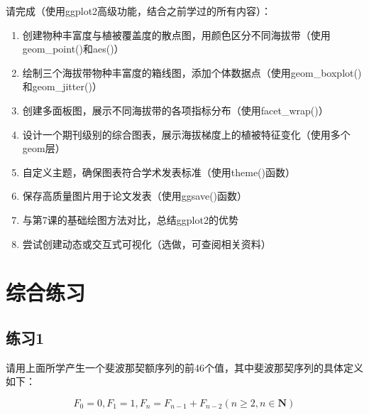 \documentclass[
]{book}
\begin{document}
请完成（使用ggplot2高级功能，结合之前学过的所有内容）：

\begin{enumerate}
\def\labelenumi{\arabic{enumi}.}
\item
  创建物种丰富度与植被覆盖度的散点图，用颜色区分不同海拔带（使用geom\_point()和aes()）
\item
  绘制三个海拔带物种丰富度的箱线图，添加个体数据点（使用geom\_boxplot()和geom\_jitter()）
\item
  创建多面板图，展示不同海拔带的各项指标分布（使用facet\_wrap()）
\item
  设计一个期刊级别的综合图表，展示海拔梯度上的植被特征变化（使用多个geom层）
\item
  自定义主题，确保图表符合学术发表标准（使用theme()函数）
\item
  保存高质量图片用于论文发表（使用ggsave()函数）
\item
  与第7课的基础绘图方法对比，总结ggplot2的优势
\item
  尝试创建动态或交互式可视化（选做，可查阅相关资料）
\end{enumerate}

\hypertarget{ux7efcux5408ux7ec3ux4e60}{%
\section{综合练习}\label{ux7efcux5408ux7ec3ux4e60}}

\hypertarget{ux7ec3ux4e601}{%
\subsection{练习1}\label{ux7ec3ux4e601}}

请用上面所学产生一个斐波那契额序列的前46个值，其中斐波那契序列的具体定义如下：

\[F_0=0, F_1=1, F_n=F_{n-1}+F_{n-2} (n \ge 2,n \in \mathbf{N})\]

  
\end{document}
